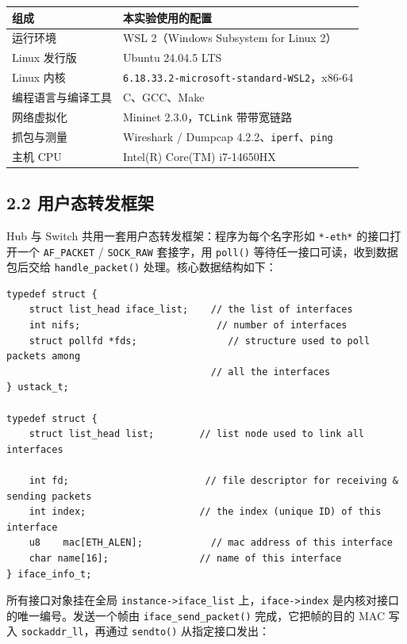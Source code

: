 \documentclass[UTF8,12pt,a4paper,fontset=fandol]{ctexart}
\begin{document}
{\small\setlength{\parindent}{0pt}
\begin{tabular}{@{}L{0.28\textwidth}L{0.66\textwidth}@{}}
\toprule
{}\textbf{组成} & \textbf{本实验使用的配置}\\
\midrule
运行环境 & WSL 2（Windows Subsystem for Linux 2）\\
Linux 发行版 & Ubuntu 24.04.5 LTS\\
Linux 内核 & \texttt{6.18.33.2-microsoft-standard-WSL2}，x86-64\\
编程语言与编译工具 & C、GCC、Make\\
网络虚拟化 & Mininet 2.3.0，\texttt{TCLink} 带带宽链路\\
抓包与测量 & Wireshark / Dumpcap 4.2.2、\texttt{iperf}、\texttt{ping}\\
主机 CPU & Intel(R) Core(TM) i7-14650HX\\
\bottomrule
\end{tabular}}

\subsection*{2.2 用户态转发框架}

Hub 与 Switch 共用一套用户态转发框架：程序为每个名字形如 \texttt{*-eth*} 的接口打开一个 \texttt{AF_PACKET} / \texttt{SOCK_RAW} 套接字，用 \texttt{poll()} 等待任一接口可读，收到数据包后交给 \texttt{handle_packet()} 处理。核心数据结构如下：

\begin{verbatim}
typedef struct {
    struct list_head iface_list;    // the list of interfaces
    int nifs;                        // number of interfaces
    struct pollfd *fds;                // structure used to poll packets among
                                    // all the interfaces
} ustack_t;

typedef struct {
    struct list_head list;        // list node used to link all interfaces

    int fd;                        // file descriptor for receiving & sending packets
    int index;                    // the index (unique ID) of this interface
    u8    mac[ETH_ALEN];            // mac address of this interface
    char name[16];                // name of this interface
} iface_info_t;
\end{verbatim}

所有接口对象挂在全局 \texttt{instance->iface_list} 上，\texttt{iface->index} 是内核对接口的唯一编号。发送一个帧由 \texttt{iface_send_packet()} 完成，它把帧的目的 MAC 写入 \texttt{sockaddr_ll}，再通过 \texttt{sendto()} 从指定接口发出：
\end{document}
